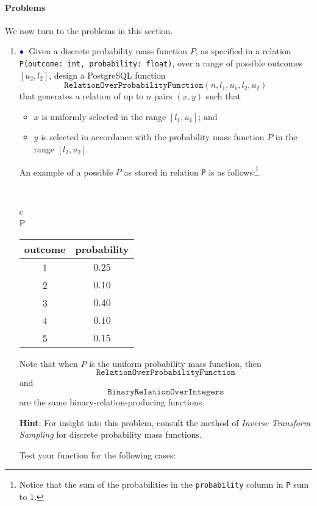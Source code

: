 \documentclass{article}
\newcommand{\bluebullet}{$\textcolor{blue}{\bullet}$}
\begin{document}
\paragraph{Problems}
We now turn to the problems in this section.
\begin{enumerate}[resume]
\item\label{probdistribution}\bluebullet\  Given a discrete probability mass function $P$, as specified in a relation {\tt P(outcome: int, probability: float)}, over a range of possible outcomes $[u_2,l_2]$, design a PostgreSQL function 
\[\mathtt{RelationOverProbabilityFunction}(n,l_1,u_1,l_2,u_2)\] that generates a relation of up to $n$ pairs $(x,y)$ such that
\begin{itemize}
\item  $x$ is uniformly selected in the range $[l_1,u_1]$; and
\item  $y$ is selected in accordance with the probability mass function $P$ in the range $[l_2,u_2]$.
\end{itemize}

An example of a possible $P$ as stored in relation {\tt P} is as follows:\footnote{Notice that the sum of the probabilities in the {\tt probability} column in {\tt P} sum to $1$.}
\begin{center}
{\tt 
\begin{tabular}{c} \\
P \\
\begin{tabular}{cc}
outcome & probability \\ \hline
1 & $0.25$ \\ 
2 & $0.10$ \\
3 & $0.40$ \\
4 & $0.10$ \\
5 & $0.15$ \\
\end{tabular}
\end{tabular}
}
\end{center}

Note that when $P$ is the uniform probability mass function, then
\[\mathtt{RelationOverProbabilityFunction}\]
and
\[\mathtt{BinaryRelationOverIntegers}\] are the same binary-relation-producing functions.

{\bf Hint}:  For insight into this problem, consult the method of 
\emph{Inverse Transform Sampling} for discrete probability mass functions.


Test your function for the following cases:
\begin{enumerate}


\end{enumerate}
\end{enumerate}
\end{document}
